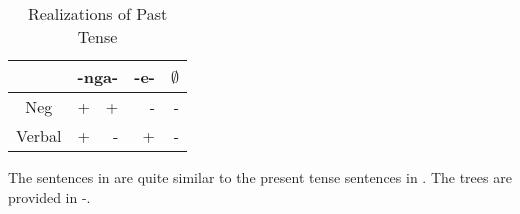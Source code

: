 \documentclass[output=paper]{langsci/langscibook}
\begin{document}
\begin{table}
\caption{Realizations of Past Tense} %
\centering %
\begin{tabular}{c| rr|r|r} %
\hline %
 &\multicolumn{2}{c}{-nga-}& \multicolumn{1}{|c}{-e-}& \multicolumn{1}{|c}{$\emptyset$} \\ [0.5ex] 
\hline %
Neg & + & + & - & -\\ %
Verbal & + & - & +& -\\[1ex] %
\hline %
\end{tabular} 
\label{tab:hresult} 
\end{table} 


The sentences in  are quite similar to the present tense sentences in . The trees are provided in -.




\begin{exe}
\ex
\end{exe}
% 
% 
% 
\end{document}
